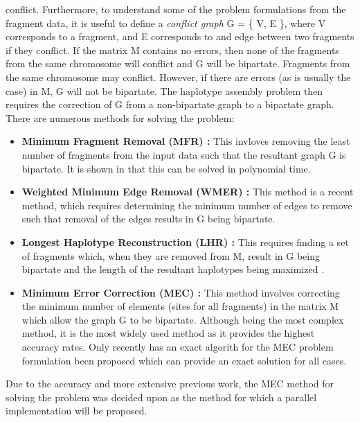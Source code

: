\documentclass[10pt,twocolumn]{witseiepaper}
\begin{document}
conflict. Furthermore, to understand some of the problem formulations from the fragment data, it is useful to
define a \textit{conflict graph} \cite{lancia:2001} G = \{ V, E \}, where V corresponds to a fragment, and E
corresponds to and edge between two fragments if they conflict. If the matrix M contains no errors, then none
of the fragments from the same chromosome will conflict and G will be bipartate. Fragments from the same
chromosome may conflict. However, if there are errors (as is usually the case) in M, G will not be
bipartate. The haplotype assembly problem then requires the correction of G from a non-bipartate 
graph to a bipartate graph. There are numerous methods for solving the problem:

\begin{itemize}
    \item{ \textbf{Minimum Fragment Removal (MFR) :} This invloves removing the least number of fragments 
            from the input data such that the resultant graph G is bipartate. It is shown in 
            \cite{lancia:2001} that this can be solved in polynomial time.
        }
    \item{ \textbf{Weighted Minimum Edge Removal (WMER) \cite{aguiar:2012} :} This method is a recent method,
            which requires determining the minimum number of edges to remove such that removal of the edges
            results in G being bipartate.
        }
    \item{ \textbf{Longest Haplotype Reconstruction (LHR) :} This requires finding a set of fragments which,
            when they are removed from M, result in G being bipartate and the length of the resultant 
            haplotypes being maximized \cite{schwartz:2010}. 
        }
    \item{ \textbf{Minimum Error Correction (MEC) :} This method involves correcting the minimum number of 
            elements (sites for all fragments) in the matrix M which allow the graph G to be bipartate. 
            Although being the most complex method, it is the most widely used method as it provides the 
            highest accuracy rates. Only recently has an exact algorith for the MEC problem formulation been
            proposed which can provide an exact solution for all cases.
        }
\end{itemize}

Due to the accuracy and more extensive previous work, the MEC method for solving the problem was decided upon
as the method for which a parallel implementation will be proposed.
\end{document}
